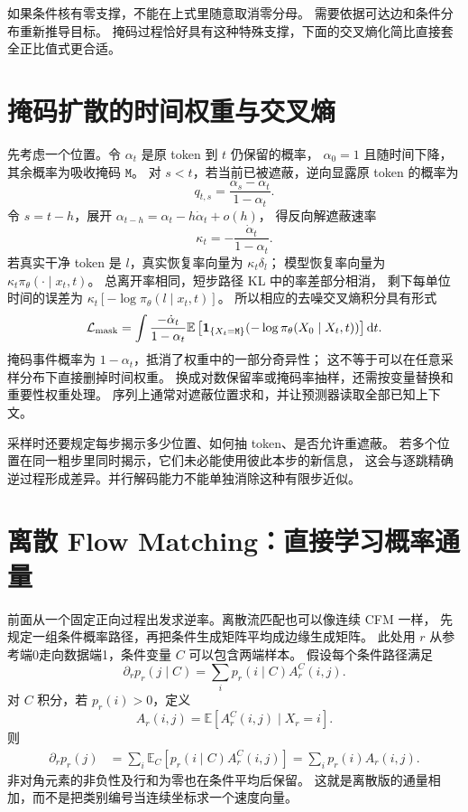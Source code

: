 如果条件核有零支撑，不能在上式里随意取消零分母。
需要依据可达边和条件分布重新推导目标。
掩码过程恰好具有这种特殊支撑，下面的交叉熵化简比直接套全正比值式更合适。

\section{掩码扩散的时间权重与交叉熵}
先考虑一个位置。令 $\alpha_t$ 是原 token 到 $t$ 仍保留的概率，
$\alpha_0=1$ 且随时间下降，其余概率为吸收掩码 $\mathtt M$。
对 $s<t$，若当前已被遮蔽，逆向显露原 token 的概率为
\[
q_{t,s}=\frac{\alpha_s-\alpha_t}{1-\alpha_t}.
\]
令 $s=t-h$，展开 $\alpha_{t-h}=\alpha_t-h\dot\alpha_t+o(h)$，
得反向解遮蔽速率
\[
\kappa_t=-\frac{\dot\alpha_t}{1-\alpha_t}.
\]
若真实干净 token 是 $l$，真实恢复率向量为 $\kappa_t\delta_l$；
模型恢复率向量为 $\kappa_t\pi_\theta(\cdot\mid x_t,t)$。
总离开率相同，短步路径 KL 中的率差部分相消，
剩下每单位时间的误差为 $\kappa_t[-\log\pi_\theta(l\mid x_t,t)]$。
所以相应的去噪交叉熵积分具有形式
\[
\mathcal L_{\rm mask}=\int
\frac{-\dot\alpha_t}{1-\alpha_t}
\mathbb E\left[\mathbf1_{\{X_t=\mathtt M\}}
 (-\log\pi_\theta(X_0\mid X_t,t))\right]\mathrm dt.
\label{supp:masked-loss}
\]
掩码事件概率为 $1-\alpha_t$，抵消了权重中的一部分奇异性；
这不等于可以在任意采样分布下直接删掉时间权重。
换成对数保留率或掩码率抽样，还需按变量替换和重要性权重处理。
序列上通常对遮蔽位置求和，并让预测器读取全部已知上下文。
\cite{mdlm,theorybook}

采样时还要规定每步揭示多少位置、如何抽 token、是否允许重遮蔽。
若多个位置在同一粗步里同时揭示，它们未必能使用彼此本步的新信息，
这会与逐跳精确逆过程形成差异。并行解码能力不能单独消除这种有限步近似。

\section{离散 Flow Matching：直接学习概率通量}
前面从一个固定正向过程出发求逆率。离散流匹配也可以像连续 CFM 一样，
先规定一组条件概率路径，再把条件生成矩阵平均成边缘生成矩阵。
此处用 $r$ 从参考端0走向数据端1，条件变量 $C$ 可以包含两端样本。
假设每个条件路径满足
\[
\partial_rp_r(j\mid C)=\sum_i p_r(i\mid C)A_r^C(i,j).
\]
对 $C$ 积分，若 $p_r(i)>0$，定义
\[
A_r(i,j)=\mathbb E[A_r^C(i,j)\mid X_r=i].
\]
则
\begin{align}
\partial_rp_r(j)
 &=\sum_i\mathbb E_C[p_r(i\mid C)A_r^C(i,j)]
 =\sum_i p_r(i)A_r(i,j).
\end{align}
非对角元素的非负性及行和为零也在条件平均后保留。
这就是离散版的通量相加，而不是把类别编号当连续坐标求一个速度向量。

